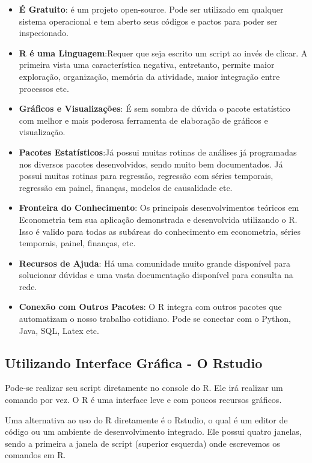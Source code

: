 \documentclass[
  letterpaper,
  DIV=11,
  numbers=noendperiod]{scrreprt}
\begin{document}
\begin{itemize}
\item
  \textbf{É Gratuito}: é um projeto open-source. Pode ser utilizado em
  qualquer sistema operacional e tem aberto seus códigos e pactos para
  poder ser inspecionado.
\item
  \textbf{R é uma Linguagem}:Requer que seja escrito um script ao invés
  de clicar. A primeira vista uma característica negativa, entretanto,
  permite maior exploração, organização, memória da atividade, maior
  integração entre processos etc.
\item
  \textbf{Gráficos e Visualizações}: É sem sombra de dúvida o pacote
  estatístico com melhor e mais poderosa ferramenta de elaboração de
  gráficos e visualização.
\item
  \textbf{Pacotes Estatísticos}:Já possui muitas rotinas de análises já
  programadas nos diversos pacotes desenvolvidos, sendo muito bem
  documentados. Já possui muitas rotinas para regressão, regressão com
  séries temporais, regressão em painel, finanças, modelos de
  causalidade etc.
\item
  \textbf{Fronteira do Conhecimento}: Os principais desenvolvimentos
  teóricos em Econometria tem sua aplicação demonstrada e desenvolvida
  utilizando o R. Isso é valido para todas as subáreas do conhecimento
  em econometria, séries temporais, painel, finanças, etc.
\item
  \textbf{Recursos de Ajuda}: Há uma comunidade muito grande disponível
  para solucionar dúvidas e uma vasta documentação disponível para
  consulta na rede.
\item
  \textbf{Conexão com Outros Pacotes}: O R integra com outros pacotes
  que automatizam o nosso trabalho cotidiano. Pode se conectar com o
  Python, Java, SQL, Latex etc.
\end{itemize}

\subsection{Utilizando Interface Gráfica - O
Rstudio}\label{utilizando-interface-gruxe1fica---o-rstudio}

Pode-se realizar seu script diretamente no console do R. Ele irá
realizar um comando por vez. O R é uma interface leve e com poucos
recursos gráficos.

Uma alternativa ao uso do R diretamente é o Rstudio, o qual é um editor
de código ou um ambiente de desenvolvimento integrado. Ele possui quatro
janelas, sendo a primeira a janela de script (superior esquerda) onde
escrevemos os comandos em R.
\end{document}
